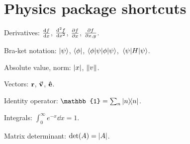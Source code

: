 \documentclass{article}
\begin{document}
\section{Physics package shortcuts}

Derivatives: $\dv{f}{x}$, $\dv[2]{f}{x}$, $\pdv{f}{x}$, $\pdv{f}{x,y}$.

Bra-ket notation: $\ket{\psi}$, $\bra{\phi}$, $\braket{\phi|\psi}$, $\expval{H}{\psi}$.

Absolute value, norm: $\abs{x}$, $\norm{v}$.

Vectors: $\vb{r}$, $\va{v}$, $\vu{e}$.

Identity operator: $\mathbb{1} = \sum_n \dyad{n}{n}$.

Integrals: $\int_0^\infty \!\! e^{-x} \dd{x} = 1$.

Matrix determinant: $\det(A) = \abs{A}$.
\end{document}
